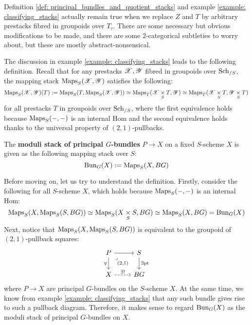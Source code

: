             \begin{remark}
                 Definition \ref{def: principal_bundles_and_quotient_stacks} and example \ref{example: classifying_stacks} actually remain true when we replace $Z$ and $T$ by arbitrary prestacks fibred in groupoids over $T_{\tau}$. There are some necessary but obvious modifications to be made, and there are some $2$-categorical subtleties to worry about, but these are mostly abstract-nonsensical.
            \end{remark}
    
            The discussion in example \ref{example: classifying_stacks} leads to the following definition. Recall that for any prestacks $\mathscr{X}, \mathscr{Y}$ fibred in groupoids over $\mathrm{Sch}_{/S}$, the mapping stack $\mathrm{Maps}_S(\mathscr{X}, \mathscr{Y})$ satisfies the following:
                $$\Maps_S(\scrX, \scrY)(T) := \Maps_S( T, \Maps_S(\scrX, \scrY) ) \cong \Maps_T(\scrX \x_S T, \scrY) \cong \Maps_T(\scrX \x_S T, \scrY \x_S T)$$
            for all prestacks $T$ in groupoids over $\mathrm{Sch}_{/S}$, where the first equivalence holds because $\mathrm{Maps}_S(-, -)$ is an internal Hom and the second equivalence holds thanks to the universal property of $(2, 1)$-pullbacks.
            \begin{definition} \label{def: moduli_stack_of_principal_bundles}
                The \textbf{moduli stack of principal $G$-bundles} $P \to X$ on a fixed $S$-scheme $X$ is given as the following mapping stack over $S$:
                    $$\mathrm{Bun}_G(X) := \mathrm{Maps}_S( X, BG )$$
            \end{definition}
            
            Before moving on, let us try to understand the definition. Firstly, consider the following for all $S$-scheme $X$, which holds because $\mathrm{Maps}_S(-, -)$ is an internal Hom:
                $$\Maps_S( X, \Maps_S( S, BG ) ) \cong \Maps_S( X \x_S S, BG ) \cong \Maps_S( X, BG ) = \Bun_G(X)$$
            Next, notice that $\mathrm{Maps}_S( X, \mathrm{Maps}_S( S, BG )  )$ is equivalent to the groupoid of $(2, 1)$-pullback squares:
                $$
                    \begin{tikzcd}
                        P & S \\
                        X & BG
                        \arrow[from=1-1, to=1-2]
                        \arrow["\forall"', from=1-1, to=2-1]
                        \arrow["{(2, 1)}"{description}, "\lrcorner"{anchor=center, pos=0.125}, draw=none, from=1-1, to=2-2]
                        \arrow["\exists \pt", from=1-2, to=2-2]
                        \arrow["{\exists!}", dashed, from=2-1, to=2-2]
                    \end{tikzcd}
                $$
            where $P \to X$ are principal $G$-bundles on the $S$-scheme $X$. At the same time, we know from example \ref{example: classifying_stacks} that any such bundle gives rise to such a pullback diagram. Therefore, it makes sense to regard $\mathrm{Bun}_G(X)$ as the moduli stack of principal $G$-bundles on $X$.
            
